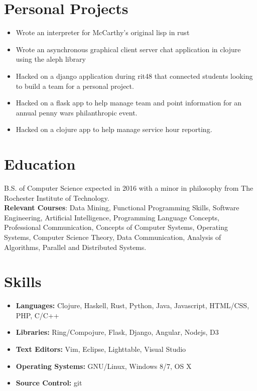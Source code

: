 \documentclass[line]{res}
\begin{document}
\address{8126 Lakeshore Rd, Burtchville, MI, 48059}
\address{(810) 304 - 6041 \\ rps9530@rit.edu \\ github.com/esapyr}

\begin{resume}
\begin{multicols}{2}

\section{Personal Projects}
\begin{itemize}
    \item Wrote an interpreter for McCarthy's original lisp in rust
    \item Wrote an asynchronous graphical client server chat application in clojure using the aleph library
    \item Hacked on a django application during rit48 that connected students looking to build a team for a personal project. 
    \item Hacked on a flask app to help manage team and point information for an annual penny wars philanthropic event.
    \item Hacked on a clojure app to help manage service hour reporting.
\end{itemize}

\section{Education}
B.S. of Computer Science expected in 2016 with a minor in philosophy from The Rochester Institute of Technology. 
\\
\textbf{Relevant Courses}: Data Mining, Functional Programming Skills, Software Engineering, Artificial Intelligence, 
Programming Language Concepts, Professional Communication, Concepts of Computer Systems, Operating Systems, 
Computer Science Theory, Data Communication, Analysis of Algorithms, Parallel and Distributed Systems.

\section{Skills}
\begin{itemize}
    \item \textbf{Languages:} Clojure, Haskell, Rust, Python, Java, Javascript, HTML/CSS, PHP, C/C++
    \item \textbf{Libraries:} Ring/Compojure, Flask, Django, Angular, Nodejs, D3
    \item \textbf{Text Editors:} Vim, Eclipse, Lighttable, Visual Studio
    \item \textbf{Operating Systems:} GNU/Linux, Windows 8/7, OS X
    \item \textbf{Source Control:} git
\end{itemize}


\end{multicols}
\end{resume}
\end{document}
